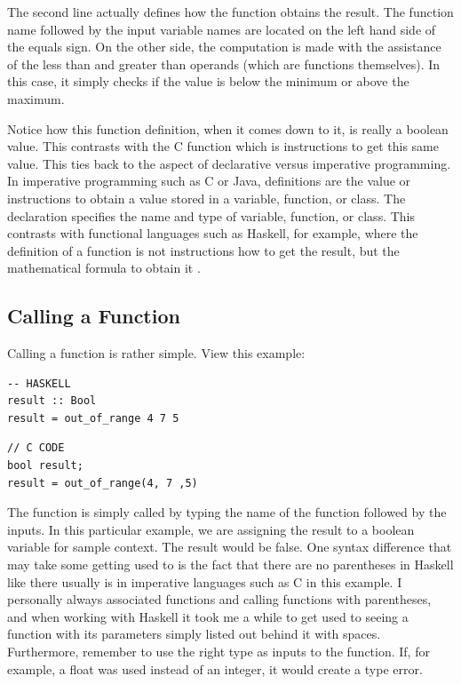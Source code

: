 \documentclass{article}
\begin{document}
\medskip\noindent
The second line actually defines how the function obtains the result. The function name followed by the input variable names are located on the left hand side of the equals sign. On the other side, the computation is made with the assistance of the less than and greater than operands (which are functions themselves). In this case, it simply checks if the value is below the minimum or above the maximum.

\medskip\noindent
Notice how this function definition, when it comes down to it, is really a boolean value. This contrasts with the C function which is instructions to get this same value. This ties back to the aspect of declarative versus imperative programming. In imperative programming such as C or Java, definitions are the value or instructions to obtain a value stored in a variable, function, or class. The declaration specifies the name and type of variable, function, or class. This contrasts with functional languages such as Haskell, for example, where the definition of a function is not instructions how to get the result, but the mathematical formula to obtain it \cite{DD}.

\subsection{Calling a Function}
\medskip\noindent
Calling a function is rather simple. View this example:

\begin{lstlisting}[style=HaskellStyle]
-- HASKELL
result :: Bool
result = out_of_range 4 7 5
\end{lstlisting}

\begin{lstlisting}[style=CStyle]
// C CODE
bool result;
result = out_of_range(4, 7 ,5)
\end{lstlisting}

\medskip\noindent
The function is simply called by typing the name of the function followed by the inputs. In this particular example, we are assigning the result to a boolean variable for sample context. The result would be false. One syntax difference that may take some getting used to is the fact that there are no parentheses in Haskell like there usually is in imperative languages such as C in this example. I personally always associated functions and calling functions with parentheses, and when working with Haskell it took me a while to get used to seeing a function with its parameters simply listed out behind it with spaces. Furthermore, remember to use the right type as inputs to the function. If, for example, a float was used instead of an integer, it would create a type error.
\end{document}

